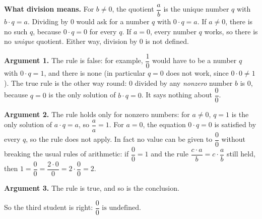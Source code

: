 \textbf{What division means.} For $b\ne0$, the quotient $\dfrac ab$ is the unique number $q$ with $b\cdot q=a$. Dividing by $0$ would ask for a number $q$ with $0\cdot q=a$. If $a\ne0$, there is no such $q$, because $0\cdot q=0$ for every $q$. If $a=0$, every number $q$ works, so there is no \emph{unique} quotient. Either way, division by $0$ is not defined.

\textbf{Argument 1.} The rule is false: for example, $\dfrac10$ would have to be a number $q$ with $0\cdot q=1$, and there is none (in particular $q=0$ does not work, since $0\cdot0\ne1$). The true rule is the other way round: $0$ divided by any \emph{nonzero} number $b$ is $0$, because $q=0$ is the only solution of $b\cdot q=0$. It says nothing about $\dfrac00$.

\textbf{Argument 2.} The rule holds only for nonzero numbers: for $a\ne0$, $q=1$ is the only solution of $a\cdot q=a$, so $\dfrac aa=1$. For $a=0$, the equation $0\cdot q=0$ is satisfied by every $q$, so the rule does not apply. In fact no value can be given to $\dfrac00$ without breaking the usual rules of arithmetic: if $\dfrac00=1$ and the rule $\dfrac{c\cdot a}{b}=c\cdot\dfrac ab$ still held, then $1=\dfrac00=\dfrac{2\cdot0}{0}=2\cdot\dfrac00=2$.

\textbf{Argument 3.} The rule is true, and so is the conclusion.

So the third student is right: $\boxed{\dfrac00\text{ is undefined}}$.

